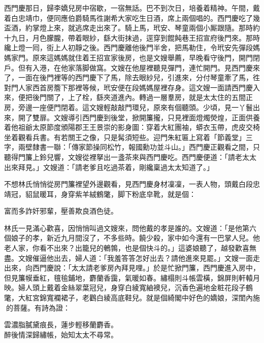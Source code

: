 西門慶那日，歸李嬌兒房中宿歇，一宿無話。巴不到次日，培養着精神。{}午間，戴着白忠靖巾，便同應伯爵騎馬徃謝希大家吃生日酒，席上兩個唱的。西門慶吃了幾盃酒，約掌燈上來，就逃席走出來了。騎上馬，玳安、琴童兩個小厮跟隨。那時約十九日，月色朦朧，帶着眼紗，繇大街抹過，逕穿到餛飩巷王招宣府後門來。那時纔上燈一囘，街上人初靜之後。西門慶離他後門半舍，把馬勒住，令玳安先彈段媽媽家門。原來這媽媽就住着王招宣家後房，也是文嫂舉薦，早晚看守後門，開門閉戶。但有入港，在他家落脚做窩。文嫂在他屋裡聽見彈門，連忙開門。見西門慶來了，一面在後門裡等的西門慶下了馬，除去眼紗兒，引進來，分付琴童牽了馬，徃對門人家西首房簷下那裡等候，玳安便在段媽媽屋裡存身。這文嫂一面請西門慶入來，便把後門關了，上了栓，繇夾道進內。轉過一層羣房，就是太太住的五間正房，旁邊一座便門閉着。這文嫂輕敲敲門環兒，原來有個聽頭。少頃，見一丫鬟出來，開了雙扉。文嫂導引西門慶到後堂，掀開簾攏，只見裡面燈燭熒煌，正面供養着他祖爺太原節度頒陽郡王王景崇的影身圖：穿着大紅團袖，蟒衣玉帶，虎皮交椅坐着觀看兵書。有若關王之像，{}只是髯須短些。迎門朱紅匾上寫着「節義堂」三字，兩壁隸書一聯：「傳家節操同松竹，{}報國勳功並斗山。」西門慶正觀看之間，只聽得門簾上鈴兒響，文嫂從裡拏出一盞茶來與西門慶吃。西門慶便道：「請老太太出來拜見。」文嫂道：「請老爹且吃過茶着，剛纔稟過太太知道了。」

不想林氏悄悄從房門簾裡望外邊觀看，見西門慶身材凜凜，一表人物，頭戴白段忠靖冠，貂鼠暖耳，身穿紫羊絨鶴氅，脚下粉底皁靴，就是個：

\begin{myquote} 
富而多詐奸邪輩，壓善欺良酒色徒。
\end{myquote} 

林氏一見滿心歡喜，因悄悄叫過文嫂來，問他戴的孝是誰的。文嫂道：「是他第六個娘子的孝，新近九月間沒了，不多些時。饒少殺，家中如今還有一巴掌人兒。他老人家，你看不出來？出籠兒的鵪鶉，也是個快斗的。」{}這婆娘聽了，越發歡喜無盡。文嫂催逼他出去，婦人道：「我羞答答怎好出去？請他進來見罷。」{}文嫂一面走出來，向西門慶說：「太太請老爹房內拜見哩。」於是忙掀門簾，西門慶進入房中，但見簾幙垂紅，氊毺鋪地，麝蘭香靄，氣暖如春。繡榻則斗帳雲橫，錦屏則軒轅月映。婦人頭上戴着金絲翠葉冠兒，身穿白綾寬紬襖兒，沉香色遍地金粧花段子鶴氅，大紅宮錦寬襴裙子，老鸛白綾高底鞋兒。就是個綺閣中好色的嬌娘，深閨內施𣭈的菩薩。有詩為證：

\begin{myquote} 
雲濃脂膩黛痕長，蓮步輕移蘭麝香。\\
醉後情深歸繡帳，始知太太不尋常。{}
\end{myquote} 

